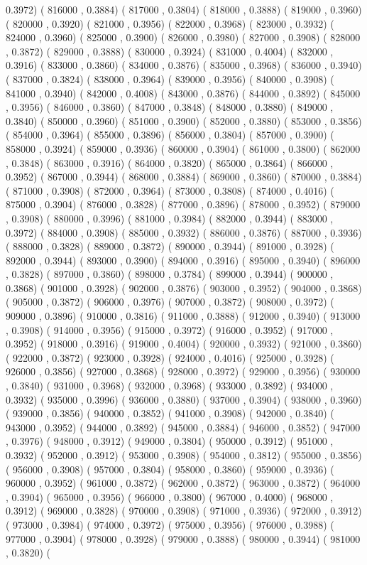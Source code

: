 \documentclass[10pt]{article}
\begin{document}
0.3972)  ( 816000 , 0.3884)  ( 817000 , 0.3804)  ( 818000 , 0.3888)  ( 819000 , 0.3960)  ( 820000 , 0.3920)  ( 821000 , 0.3956)  ( 822000 , 0.3968)  ( 823000 , 0.3932)  ( 824000 , 0.3960)  ( 825000 , 0.3900)  ( 826000 , 0.3980)  ( 827000 , 0.3908)  ( 828000 , 0.3872)  ( 829000 , 0.3888)  ( 830000 , 0.3924)  ( 831000 , 0.4004)  ( 832000 , 0.3916)  ( 833000 , 0.3860)  ( 834000 , 0.3876)  ( 835000 , 0.3968)  ( 836000 , 0.3940)  ( 837000 , 0.3824)  ( 838000 , 0.3964)  ( 839000 , 0.3956)  ( 840000 , 0.3908)  ( 841000 , 0.3940)  ( 842000 , 0.4008)  ( 843000 , 0.3876)  ( 844000 , 0.3892)  ( 845000 , 0.3956)  ( 846000 , 0.3860)  ( 847000 , 0.3848)  ( 848000 , 0.3880)  ( 849000 , 0.3840)  ( 850000 , 0.3960)  ( 851000 , 0.3900)  ( 852000 , 0.3880)  ( 853000 , 0.3856)  ( 854000 , 0.3964)  ( 855000 , 0.3896)  ( 856000 , 0.3804)  ( 857000 , 0.3900)  ( 858000 , 0.3924)  ( 859000 , 0.3936)  ( 860000 , 0.3904)  ( 861000 , 0.3800)  ( 862000 , 0.3848)  ( 863000 , 0.3916)  ( 864000 , 0.3820)  ( 865000 , 0.3864)  ( 866000 , 0.3952)  ( 867000 , 0.3944)  ( 868000 , 0.3884)  ( 869000 , 0.3860)  ( 870000 , 0.3884)  ( 871000 , 0.3908)  ( 872000 , 0.3964)  ( 873000 , 0.3808)  ( 874000 , 0.4016)  ( 875000 , 0.3904)  ( 876000 , 0.3828)  ( 877000 , 0.3896)  ( 878000 , 0.3952)  ( 879000 , 0.3908)  ( 880000 , 0.3996)  ( 881000 , 0.3984)  ( 882000 , 0.3944)  ( 883000 , 0.3972)  ( 884000 , 0.3908)  ( 885000 , 0.3932)  ( 886000 , 0.3876)  ( 887000 , 0.3936)  ( 888000 , 0.3828)  ( 889000 , 0.3872)  ( 890000 , 0.3944)  ( 891000 , 0.3928)  ( 892000 , 0.3944)  ( 893000 , 0.3900)  ( 894000 , 0.3916)  ( 895000 , 0.3940)  ( 896000 , 0.3828)  ( 897000 , 0.3860)  ( 898000 , 0.3784)  ( 899000 , 0.3944)  ( 900000 , 0.3868)  ( 901000 , 0.3928)  ( 902000 , 0.3876)  ( 903000 , 0.3952)  ( 904000 , 0.3868)  ( 905000 , 0.3872)  ( 906000 , 0.3976)  ( 907000 , 0.3872)  ( 908000 , 0.3972)  ( 909000 , 0.3896)  ( 910000 , 0.3816)  ( 911000 , 0.3888)  ( 912000 , 0.3940)  ( 913000 , 0.3908)  ( 914000 , 0.3956)  ( 915000 , 0.3972)  ( 916000 , 0.3952)  ( 917000 , 0.3952)  ( 918000 , 0.3916)  ( 919000 , 0.4004)  ( 920000 , 0.3932)  ( 921000 , 0.3860)  ( 922000 , 0.3872)  ( 923000 , 0.3928)  ( 924000 , 0.4016)  ( 925000 , 0.3928)  ( 926000 , 0.3856)  ( 927000 , 0.3868)  ( 928000 , 0.3972)  ( 929000 , 0.3956)  ( 930000 , 0.3840)  ( 931000 , 0.3968)  ( 932000 , 0.3968)  ( 933000 , 0.3892)  ( 934000 , 0.3932)  ( 935000 , 0.3996)  ( 936000 , 0.3880)  ( 937000 , 0.3904)  ( 938000 , 0.3960)  ( 939000 , 0.3856)  ( 940000 , 0.3852)  ( 941000 , 0.3908)  ( 942000 , 0.3840)  ( 943000 , 0.3952)  ( 944000 , 0.3892)  ( 945000 , 0.3884)  ( 946000 , 0.3852)  ( 947000 , 0.3976)  ( 948000 , 0.3912)  ( 949000 , 0.3804)  ( 950000 , 0.3912)  ( 951000 , 0.3932)  ( 952000 , 0.3912)  ( 953000 , 0.3908)  ( 954000 , 0.3812)  ( 955000 , 0.3856)  ( 956000 , 0.3908)  ( 957000 , 0.3804)  ( 958000 , 0.3860)  ( 959000 , 0.3936)  ( 960000 , 0.3952)  ( 961000 , 0.3872)  ( 962000 , 0.3872)  ( 963000 , 0.3872)  ( 964000 , 0.3904)  ( 965000 , 0.3956)  ( 966000 , 0.3800)  ( 967000 , 0.4000)  ( 968000 , 0.3912)  ( 969000 , 0.3828)  ( 970000 , 0.3908)  ( 971000 , 0.3936)  ( 972000 , 0.3912)  ( 973000 , 0.3984)  ( 974000 , 0.3972)  ( 975000 , 0.3956)  ( 976000 , 0.3988)  ( 977000 , 0.3904)  ( 978000 , 0.3928)  ( 979000 , 0.3888)  ( 980000 , 0.3944)  ( 981000 , 0.3820)  ( 
\end{document}
